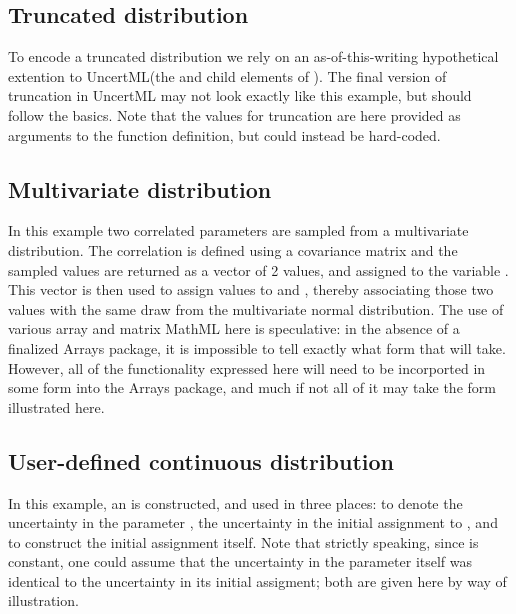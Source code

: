 \documentclass[draftspec]{sbmlpkgspec}
\newcommand{\ExplicitPDF}{\defRef{ExplicitPDF}{explicitPDF-class}}
\newcommand{\mathml}{MathML\xspace}
\newcommand{\uncertml}{UncertML\xspace}
\begin{document}

\subsection{Truncated distribution}
\label{sec: truncated-eg}

To encode a truncated distribution we rely on an as-of-this-writing hypothetical extention to \uncertml (the  and  child elements of ).  The final version of truncation in \uncertml may not look exactly like this example, but should follow the basics.  Note that the values for truncation are here provided as arguments to the function definition, but could instead be hard-coded.


\subsection{Multivariate distribution}

In this example two correlated parameters are sampled from a
multivariate distribution. The correlation is defined using a
covariance matrix and the sampled values are returned as a vector of 2
values, and assigned to the variable .  This vector is then used to assign values to  and , thereby associating those two values with the same draw from the multivariate normal distribution.  The use of various array and matrix \mathml here is speculative:  in the absence of a finalized Arrays package, it is impossible to tell exactly what form that will take.  However, all of the functionality expressed here will need to be incorported in some form into the Arrays package, and much if not all of it may take the form illustrated here.


\subsection{User-defined continuous distribution }

In this example, an \ExplicitPDF is constructed, and used in three places:  to denote the uncertainty in the parameter , the uncertainty in the initial assignment to , and to construct the initial assignment itself.  Note that strictly speaking, since  is constant, one could assume that the uncertainty in the parameter itself was identical to the uncertainty in its initial assigment; both are given here by way of illustration.
\end{document}
